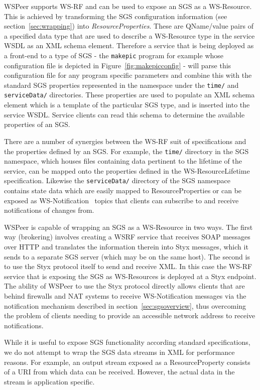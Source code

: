\documentclass[a4paper]{article}
\begin{document}
WSPeer supports WS-RF and can be used to expose an SGS as a WS-Resource. This is achieved by transforming the SGS configuration information (see section~\ref{sec:wrapping}) into \textit{ResourceProperties\/}. These are QName/value pairs of a specified data type that are used to describe a WS-Resource type in the service WSDL as an XML schema element. Therefore a service that is being deployed as a front-end to a type of SGS - the \texttt{makepic} program for example whose configuration file is depicted in Figure~\ref{fig:makepicconfig} - will parse this configuration file for any program specific parameters and combine this with the standard SGS properties represented in the namespace under the \texttt{time/} and  \texttt{serviceData/} directories. These properties are used to populate an XML schema element which is a template of the particular SGS type, and is inserted into the service WSDL. Service clients can read this schema to determine the available properties of an SGS.

There are a number of synergies between the WS-RF suit of specifications and the properties defined by an SGS. For example, the \texttt{time/} directory in the SGS namespace, which houses files containing data pertinent to the lifetime of the service, can be mapped onto the properties defined in the WS-ResourceLifetime~\cite{wsrf-lifetime} specification. Likewise the \texttt{serviceData/} directory of the SGS namespace contains state data which are easily mapped to ResourceProperties or can be exposed as WS-Notification~\cite{wsrf-notification} topics that clients can subscribe to and receive notifications of changes from.

WSPeer is capable of wrapping an SGS as a WS-Resource in two ways.  The first way (brokering) involves creating a WSRF service that receives SOAP messages over HTTP and translates the information therein into Styx messages, which it sends to a separate SGS server (which may be on the same host). The second is to use the Styx protocol itself to send and receive XML. In this case the WS-RF service that is exposing the SGS as WS-Resources is deployed at a Styx endpoint. The ability of WSPeer to use the Styx protocol directly allows clients that are behind firewalls and NAT systems to receive WS-Notification messages via the notification mechanism described in section~\ref{sec:sgsoverview}, thus overcoming the problem of clients needing to provide an accessible network address to receive notifications.

While it is useful to expose SGS functionality according standard specifications, we do not attempt to wrap the SGS data streams in XML for performance reasons. For example, an output stream exposed as a ResourceProperty consists of a URI from which data can be received. However, the actual data in the stream is application specific. 
\end{document}
